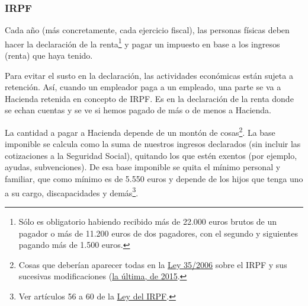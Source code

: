 \documentclass[nochap,palatino,shortheader]{apuntes}
\begin{document}
\subsubsection{IRPF}

Cada año (más concretamente, cada ejercicio fiscal), las personas físicas deben hacer la declaración de la renta\footnote{Sólo es obligatorio habiendo recibido más de 22.000 euros brutos de un pagador o más de 11.200 euros de dos pagadores, con el segundo y siguientes pagando más de 1.500 euros.} y pagar un impuesto en base a los ingresos (renta) que haya tenido.

Para evitar el susto en la declaración, las actividades económicas están sujeta a retención. Así, cuando un empleador paga a un empleado, una parte se va a Hacienda retenida en concepto de IRPF\footnotemark. Es en la declaración de la renta donde se echan cuentas y se ve si hemos pagado de más o de menos a Hacienda.


La cantidad a pagar a Hacienda depende de un montón de cosas\footnote{Cosas que deberían aparecer todas en la \href{https://www.boe.es/buscar/act.php?id=BOE-A-2006-20764&tn=1&vd=&p=20151030}{Ley 35/2006} sobre el IRPF y sus sucesivas modificaciones (\href{http://www.boe.es/diario_boe/txt.php?id=BOE-A-2015-7765}{la última, de 2015}.}. La base imponible se calcula como la suma de nuestros ingresos declarados (sin incluir las cotizaciones a la Seguridad Social), quitando los que estén exentos (por ejemplo, ayudas, subvenciones). De esa base imponible se quita el mínimo personal y familiar, que como mínimo es de 5.550 euros y depende de los hijos que tenga uno a su cargo, discapacidades y demás\footnote{Ver artículos 56 a 60 de la \href{https://www.boe.es/buscar/act.php?id=BOE-A-2006-20764&b=29&tn=1&p=20141128}{Ley del IRPF}.}.
\end{document}
